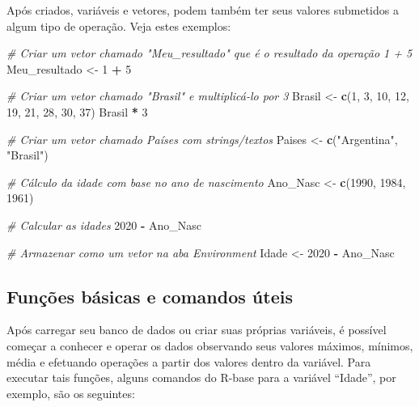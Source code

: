 \documentclass[
  10pt,
  brazil,
  a4paper,
  twoside, notitlepage, openright]{book}
\newenvironment{Shaded}{\begin{snugshade}}{\end{snugshade}}
\newcommand{\CommentTok}[1]{\textcolor[rgb]{0.56,0.35,0.01}{\textit{#1}}}
\newcommand{\DecValTok}[1]{\textcolor[rgb]{0.00,0.00,0.81}{#1}}
\newcommand{\KeywordTok}[1]{\textcolor[rgb]{0.13,0.29,0.53}{\textbf{#1}}}
\newcommand{\NormalTok}[1]{#1}
\newcommand{\OperatorTok}[1]{\textcolor[rgb]{0.81,0.36,0.00}{\textbf{#1}}}
\newcommand{\StringTok}[1]{\textcolor[rgb]{0.31,0.60,0.02}{#1}}
\begin{document}
Após criados, variáveis e vetores, podem também ter seus valores submetidos a algum tipo de operação. Veja estes exemplos:

\begin{Shaded}
\begin{Highlighting}[]
\CommentTok{# Criar um vetor chamado "Meu_resultado" que é o resultado da operação 1 + 5}
\NormalTok{Meu_resultado <-}\StringTok{ }\DecValTok{1} \OperatorTok{+}\StringTok{ }\DecValTok{5}

\CommentTok{# Criar um vetor chamado "Brasil" e multiplicá-lo por 3}
\NormalTok{Brasil <-}\StringTok{ }\KeywordTok{c}\NormalTok{(}\DecValTok{1}\NormalTok{, }\DecValTok{3}\NormalTok{, }\DecValTok{10}\NormalTok{, }\DecValTok{12}\NormalTok{, }\DecValTok{19}\NormalTok{, }\DecValTok{21}\NormalTok{, }\DecValTok{28}\NormalTok{, }\DecValTok{30}\NormalTok{, }\DecValTok{37}\NormalTok{)}
\NormalTok{Brasil }\OperatorTok{*}\StringTok{ }\DecValTok{3}

\CommentTok{# Criar um vetor chamado Países com strings/textos}
\NormalTok{Paises <-}\StringTok{ }\KeywordTok{c}\NormalTok{(}\StringTok{"Argentina"}\NormalTok{, }\StringTok{"Brasil"}\NormalTok{) }

\CommentTok{# Cálculo da idade com base no ano de nascimento}
\NormalTok{Ano_Nasc <-}\StringTok{ }\KeywordTok{c}\NormalTok{(}\DecValTok{1990}\NormalTok{, }\DecValTok{1984}\NormalTok{, }\DecValTok{1961}\NormalTok{)}

\CommentTok{# Calcular as idades}
\DecValTok{2020} \OperatorTok{-}\StringTok{ }\NormalTok{Ano_Nasc}

\CommentTok{# Armazenar como um vetor na aba Environment}
\NormalTok{Idade <-}\StringTok{ }\DecValTok{2020} \OperatorTok{-}\StringTok{ }\NormalTok{Ano_Nasc}
\end{Highlighting}
\end{Shaded}

\hypertarget{funuxe7uxf5es-buxe1sicas-e-comandos-uxfateis}{%
\subsection{Funções básicas e comandos úteis}\label{funuxe7uxf5es-buxe1sicas-e-comandos-uxfateis}}

Após carregar seu banco de dados ou criar suas próprias variáveis, é possível começar a conhecer e operar os dados observando seus valores máximos, mínimos, média e efetuando operações a partir dos valores dentro da variável. Para executar tais funções, alguns comandos do R-base para a variável ``Idade'', por exemplo, são os seguintes:
\end{document}
